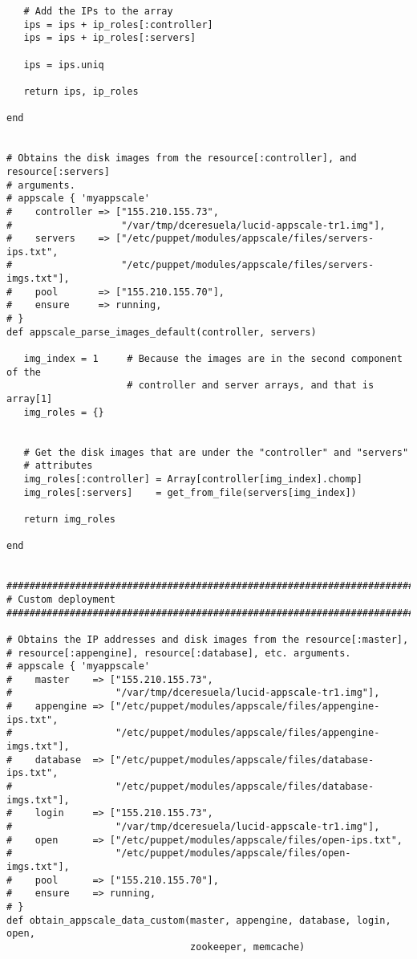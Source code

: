 \begin{lstlisting}
   # Add the IPs to the array
   ips = ips + ip_roles[:controller]
   ips = ips + ip_roles[:servers]
   
   ips = ips.uniq
   
   return ips, ip_roles
   
end


# Obtains the disk images from the resource[:controller], and resource[:servers]
# arguments.
# appscale { 'myappscale'
#    controller => ["155.210.155.73",
#                   "/var/tmp/dceresuela/lucid-appscale-tr1.img"],
#    servers    => ["/etc/puppet/modules/appscale/files/servers-ips.txt",
#                   "/etc/puppet/modules/appscale/files/servers-imgs.txt"],
#    pool       => ["155.210.155.70"],
#    ensure     => running,
# }
def appscale_parse_images_default(controller, servers)

   img_index = 1     # Because the images are in the second component of the
                     # controller and server arrays, and that is array[1]
   img_roles = {}

   
   # Get the disk images that are under the "controller" and "servers"
   # attributes
   img_roles[:controller] = Array[controller[img_index].chomp]
   img_roles[:servers]    = get_from_file(servers[img_index])
   
   return img_roles
   
end


################################################################################
# Custom deployment
################################################################################

# Obtains the IP addresses and disk images from the resource[:master],
# resource[:appengine], resource[:database], etc. arguments.
# appscale { 'myappscale'
#    master    => ["155.210.155.73",
#                  "/var/tmp/dceresuela/lucid-appscale-tr1.img"],
#    appengine => ["/etc/puppet/modules/appscale/files/appengine-ips.txt",
#                  "/etc/puppet/modules/appscale/files/appengine-imgs.txt"],
#    database  => ["/etc/puppet/modules/appscale/files/database-ips.txt",
#                  "/etc/puppet/modules/appscale/files/database-imgs.txt"],
#    login     => ["155.210.155.73",
#                  "/var/tmp/dceresuela/lucid-appscale-tr1.img"],
#    open      => ["/etc/puppet/modules/appscale/files/open-ips.txt",
#                  "/etc/puppet/modules/appscale/files/open-imgs.txt"],
#    pool      => ["155.210.155.70"],
#    ensure    => running,
# }
def obtain_appscale_data_custom(master, appengine, database, login, open,
                                zookeeper, memcache)


\end{lstlisting}
